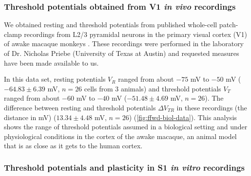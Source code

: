 \subsubsection*{Threshold potentials obtained from V1 \textit{in vivo} recordings}



We obtained resting and threshold potentials
        from published whole-cell patch-clamp recordings
        from L2/3 pyramidal neurons in the primary visual cortex (V1)
        of awake macaque monkeys \citep{Li2020-ej}.
    These recordings were performed
        in the laboratory of Dr. Nicholas Priebe (University of Texas at Austin)
        and requested measures have been made available to us.

In this data set, resting potentials $V_R$ ranged from about $-75$ mV to $-50$ mV
            ($-64.83 \pm 6.39$ mV,
            $n = 26$ cells from 3 animals)
        and threshold potentials $V_T$ ranged from about $-60$ mV to $-40$ mV
            ($-51.48 \pm 4.69$ mV,
            $n = 26$).
    The difference between resting and threshold potentials
        $\Delta V_{TR}$ in these recordings (the distance in mV)
            ($13.34 \pm 4.48$ mV,
            $n = 26$)
        (\autoref{fig:ffwd-biol-data}).
    This analysis shows the range of threshold potentials assumed
        in a biological setting and under physiological conditions
        in the cortex of the awake macaque,
        an animal model that is as close as it gets to the human cortex.

\subsubsection*{Threshold potentials and plasticity in S1 \textit{in vitro} recordings}

